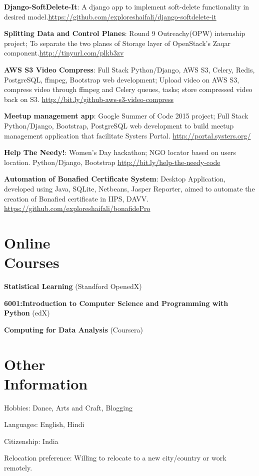 \documentclass[margin,line]{resume}
\begin{document}
\begin{resume}
\begin{list2}
    \item \textbf{Django-SoftDelete-It}: A django app to implement soft-delete functionality in desired model.\url{https://github.com/exploreshaifali/django-softdelete-it}
    \item \textbf{Splitting Data and Control Planes}: Round 9 Outreachy(OPW) internship project; To separate the two planes of Storage layer of OpenStack's Zaqar component.\url{http://tinyurl.com/plkb3zv}
    \item \textbf{AWS S3 Video Compress}: Full Stack Python/Django, AWS S3, Celery, Redis, PostgreSQL, ffmpeg, Bootstrap web development; Upload video on AWS S3, compress video through ffmpeg and Celery queues, tasks; store compressed video back on S3. \url{http://bit.ly/github-aws-s3-video-compress}
    \item \textbf{Meetup management app}: Google Summer of Code 2015 project; Full Stack Python/Django, Bootstrap, PostgreSQL web development to build meetup management application that facilitate Systers Portal. \url{http://portal.systers.org/}	
    \item \textbf{Help The Needy!}: Women's Day hackathon; NGO locator based on users location. Python/Django, Bootstrap \url{http://bit.ly/help-the-needy-code}
	\item \textbf{Automation of Bonafied Certificate System}: Desktop Application, developed using Java,
    SQLite, Netbeans, Jasper Reporter, aimed to automate the creation of Bonafied certificate in IIPS, DAVV. \url{https://github.com/exploreshaifali/bonafidePro}
    \end{list2}

    \section{\mysidestyle Online \\ Courses}

    \begin{list2}
	\item \textbf{Statistical Learning} (Standford OpenedX)
	\item \textbf{6001:Introduction to Computer Science and Programming with Python} (edX)
	\item \textbf{Computing for Data Analysis} (Coursera)
	\end{list2}

    \section{\mysidestyle Other \\ Information}
    \begin{list2}
    \item Hobbies: Dance, Arts and Craft, Blogging
    \item Languages: English, Hindi
    \item Citizenship: India
    \item Relocation preference: Willing to relocate to a new city/country or work remotely.   
    \end{list2}

\end{resume}
\end{document}
